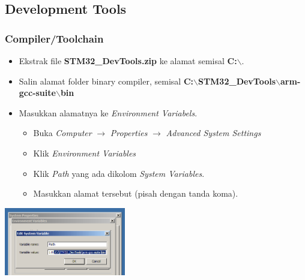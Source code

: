 \documentclass[table,dvipsnames]{beamer}
\begin{document}
	\subsection{Development Tools}
	\begin{frame}
		\frametitle{Compiler/Toolchain}
		\begin{exampleblock}{}
			\begin{itemize}
				\item Ekstrak file \textbf{STM32\_DevTools.zip} ke alamat semisal \textbf{C:$\backslash$}.
				\item Salin alamat folder binary compiler, semisal \textbf{C:$\backslash$STM32\_DevTools$\backslash$arm-gcc-suite$\backslash$bin}
				\item Masukkan alamatnya ke \textit{Environment Variabels}.
				\begin{itemize}
					\item Buka \textit{Computer} $\rightarrow$ \textit{Properties} $\rightarrow$ \textit{Advanced System Settings}
					\item Klik \textit{Environment Variables}
					\item Klik \textit{Path} yang ada dikolom \textit{System Variables}.
					\item Masukkan alamat tersebut (pisah dengan tanda koma).
				\end{itemize}
			\end{itemize}
		\end{exampleblock}

		\begin{center}
			\includegraphics[width=150pt]{images/envar}
		\end{center}
	\end{frame}
\end{document}
